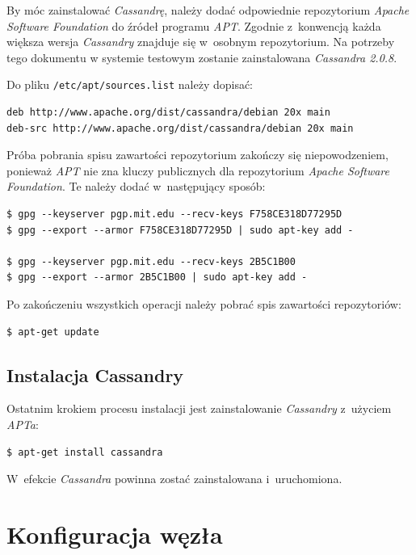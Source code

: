 \documentclass{article} %
\begin{document}
By móc zainstalować \emph{Cassandrę}, należy dodać odpowiednie repozytorium \emph{Apache Software Foundation} do źródeł programu \emph{APT}.
Zgodnie z~konwencją każda większa wersja \emph{Cassandry} znajduje się w~osobnym repozytorium.
Na potrzeby tego dokumentu w systemie testowym zostanie zainstalowana \emph{Cassandra 2.0.8}.

Do pliku \texttt{/etc/apt/sources.list} należy dopisać:

\begin{lstlisting}[style=bash, caption={nowe źródła pakietów dla \emph{APTa}}]
deb http://www.apache.org/dist/cassandra/debian 20x main
deb-src http://www.apache.org/dist/cassandra/debian 20x main
\end{lstlisting}

Próba pobrania spisu zawartości repozytorium zakończy się niepowodzeniem, ponieważ \emph{APT} nie zna kluczy publicznych dla repozytorium \emph{Apache Software Foundation}.
Te należy dodać w~następujący sposób:

\begin{lstlisting}[style=bash, caption={pobieranie kluczy publicznych repozytorium \emph{ASF}}]
$ gpg --keyserver pgp.mit.edu --recv-keys F758CE318D77295D
$ gpg --export --armor F758CE318D77295D | sudo apt-key add -

$ gpg --keyserver pgp.mit.edu --recv-keys 2B5C1B00
$ gpg --export --armor 2B5C1B00 | sudo apt-key add -
\end{lstlisting}

Po zakończeniu wszystkich operacji należy pobrać spis zawartości repozytoriów:
\begin{lstlisting}[style=bash, caption={odświeżanie list pakietów}]
$ apt-get update
\end{lstlisting}

\subsection{Instalacja Cassandry}\label{subsec:install_install}

Ostatnim krokiem procesu instalacji jest zainstalowanie \emph{Cassandry} z~użyciem \emph{APTa}:
\begin{lstlisting}[style=bash, caption={instalacja \emph{Cassandry}}]
$ apt-get install cassandra
\end{lstlisting}

W~efekcie \emph{Cassandra} powinna zostać zainstalowana i~uruchomiona.

\section{Konfiguracja węzła}\label{sec:config}
\end{document}
